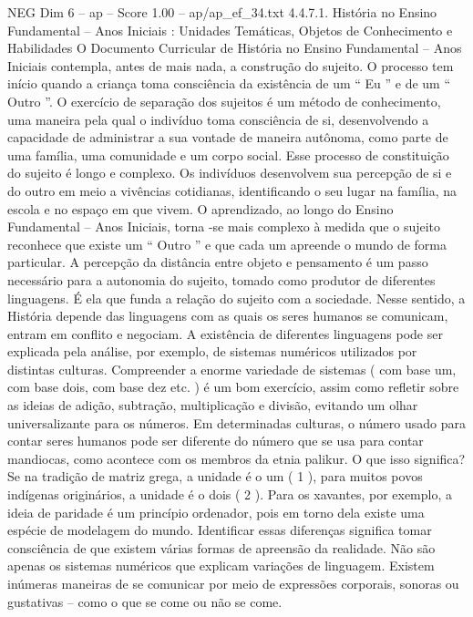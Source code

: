 \begin{textsample}{NEG Dim 6 – ap – Score 1.00 – ap/ap\_ef\_34.txt}  \label{ex:f6_neg_188}
4.4.7.1.
História no Ensino Fundamental – Anos Iniciais : Unidades Temáticas, Objetos de Conhecimento e Habilidades O Documento Curricular de História no Ensino Fundamental – Anos Iniciais contempla, antes de mais nada, a construção do sujeito.
O processo tem início quando a criança toma consciência da existência de um “ Eu ” e de um “ Outro ”.
O exercício de separação dos sujeitos é um método de conhecimento, uma maneira pela qual o indivíduo toma consciência de si, desenvolvendo a capacidade de administrar a sua vontade de maneira autônoma, como parte de uma família, uma comunidade e um corpo social.
Esse processo de constituição do sujeito é longo e complexo.
Os indivíduos desenvolvem sua percepção de si e do outro em meio a vivências cotidianas, identificando o seu lugar na família, na escola e no espaço em que vivem.
O aprendizado, ao longo do Ensino Fundamental – Anos Iniciais, torna -se mais complexo à medida que o sujeito reconhece que existe um “ Outro ” e que cada um apreende o mundo de forma particular.
A percepção da distância entre objeto e pensamento é um passo necessário para a autonomia do sujeito, tomado como produtor de diferentes linguagens.
É ela que funda a relação do sujeito com a sociedade.
Nesse sentido, a História depende das linguagens com as quais os seres humanos se comunicam, entram em conflito e negociam.
A existência de diferentes linguagens pode ser explicada pela análise, por exemplo, de sistemas numéricos utilizados por distintas culturas.
Compreender a enorme variedade de sistemas ( com base um, com base dois, com base dez etc. ) é um bom exercício, assim como refletir sobre as ideias de adição, subtração, multiplicação e divisão, evitando um olhar universalizante para os números.
Em determinadas culturas, o número usado para contar seres humanos pode ser diferente do número que se usa para contar mandiocas, como acontece com os membros da etnia palikur.
O que isso significa?
Se na tradição de matriz grega, a unidade é o um ( 1 ), para muitos povos indígenas originários, a unidade é o dois ( 2 ).
Para os xavantes, por exemplo, a ideia de paridade é um princípio ordenador, pois em torno dela existe uma espécie de modelagem do mundo.
Identificar essas diferenças significa tomar consciência de que existem várias formas de apreensão da realidade.
Não são apenas os sistemas numéricos que explicam variações de linguagem.
Existem inúmeras maneiras de se comunicar por meio de expressões corporais, sonoras ou gustativas – como o que se come ou não se come.

\end{textsample}

